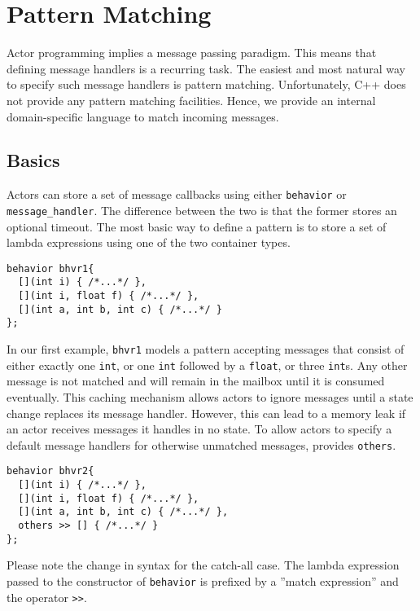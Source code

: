 \section{Pattern Matching}
\label{pattern-matching}

Actor programming implies a message passing paradigm.
This means that defining message handlers is a recurring task.
The easiest and most natural way to specify such message handlers is pattern matching.
Unfortunately, C++ does not provide any pattern matching facilities.
Hence, we provide an internal domain-specific language to match incoming messages.

\subsection{Basics}
\label{pattern-matching-basics}

Actors can store a set of message callbacks using either \lstinline^behavior^ or \lstinline^message_handler^.
The difference between the two is that the former stores an optional timeout.
The most basic way to define a pattern is to store a set of lambda expressions using one of the two container types.

\begin{lstlisting}
behavior bhvr1{
  [](int i) { /*...*/ },
  [](int i, float f) { /*...*/ },
  [](int a, int b, int c) { /*...*/ }
};
\end{lstlisting}

In our first example, \lstinline^bhvr1^ models a pattern accepting messages that consist of either exactly one \lstinline^int^, or one \lstinline^int^ followed by a \lstinline^float^, or three \lstinline^int^s.
Any other message is not matched and will remain in the mailbox until it is consumed eventually.
This caching mechanism allows actors to ignore messages until a state change replaces its message handler.
However, this can lead to a memory leak if an actor receives messages it handles in no state.
To allow actors to specify a default message handlers for otherwise unmatched messages, \lib provides \lstinline^others^.

\begin{lstlisting}
behavior bhvr2{
  [](int i) { /*...*/ },
  [](int i, float f) { /*...*/ },
  [](int a, int b, int c) { /*...*/ },
  others >> [] { /*...*/ }
};
\end{lstlisting}

Please note the change in syntax for the catch-all case.
The lambda expression passed to the constructor of \lstinline^behavior^ is prefixed by a ''match expression'' and the operator \lstinline^>>^.

